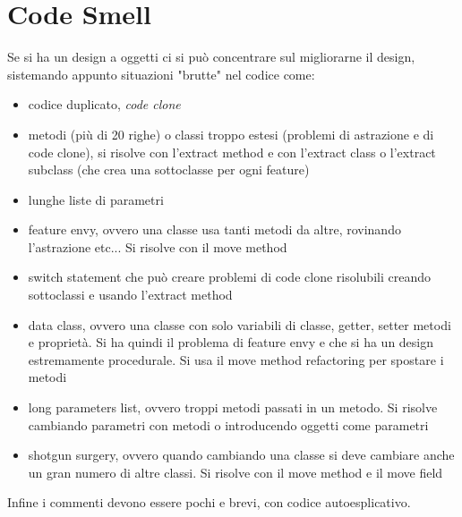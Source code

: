 \documentclass[a4paper,12pt, oneside]{book}
\begin{document}
\section{Code Smell}
Se si ha un design a oggetti ci si può concentrare sul migliorarne il design, sistemando appunto situazioni "brutte" nel codice come:
\begin{itemize}
\item codice duplicato, \textit{code clone}
\item metodi (più di 20 righe) o classi troppo estesi (problemi di astrazione e di code clone), si risolve con l'extract method e con l'extract class o l'extract subclass (che crea una sottoclasse per ogni feature)
\item lunghe liste di parametri
\item feature envy, ovvero una classe usa tanti metodi da altre, rovinando l'astrazione etc... Si risolve con il move method
\item switch statement che può creare problemi di code clone risolubili creando sottoclassi e usando l'extract method
\item data class, ovvero una classe con solo variabili di classe, getter, setter metodi e proprietà. Si ha quindi il problema di feature envy e che si ha un design estremamente procedurale. Si usa il move method refactoring per spostare i metodi
\item long parameters list, ovvero troppi metodi passati in un metodo. Si risolve cambiando parametri con metodi o introducendo oggetti come parametri
\item shotgun surgery, ovvero quando cambiando una classe si deve cambiare anche un gran numero di altre classi. Si risolve con il move method e il move field
\end{itemize}
Infine i commenti devono essere pochi e brevi, con codice autoesplicativo.
\end{document}
